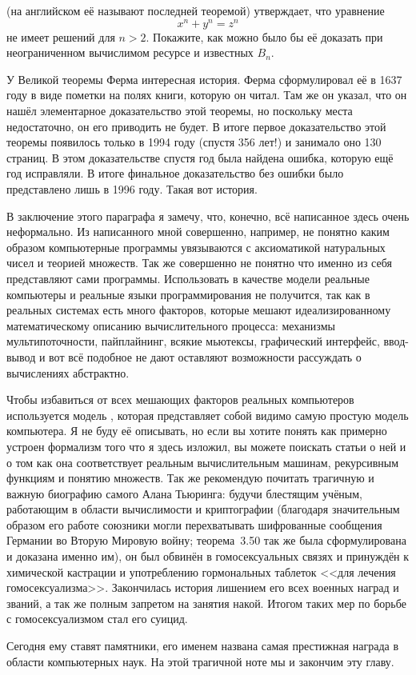 \begin{exercise}
 (на английском её называют последней теоремой) утверждает, что уравнение
$$x^n + y^n = z^n$$
не имеет решений для $n>2$. Покажите, как можно было бы её доказать при неограниченном вычислимом ресурсе и известных $B_n$.
\end{exercise}

У Великой теоремы Ферма интересная история. Ферма сформулировал её в 1637 году в виде пометки на полях книги, которую он читал. Там же он указал, что он нашёл элементарное доказательство этой теоремы, но поскольку места недостаточно, он его приводить не будет. В итоге первое доказательство этой теоремы появилось только в 1994 году (спустя 356 лет!) и занимало оно 130 страниц. В этом доказательстве спустя год была найдена ошибка, которую ещё год исправляли. В итоге финальное доказательство без ошибки было представлено лишь в 1996 году. Такая вот история.

В заключение этого параграфа я замечу, что, конечно, всё написанное здесь очень неформально. Из написанного мной совершенно, например, не понятно каким образом компьютерные программы увязываются с аксиоматикой натуральных чисел и теорией множеств. Так же совершенно не понятно что именно из себя представляют сами программы. Использовать в качестве модели реальные компьютеры и реальные языки программирования не получится, так как в реальных системах есть много факторов, которые мешают идеализированному математическому описанию вычислительного процесса: механизмы мультипоточности, пайплайнинг, всякие мьютексы, графический интерфейс, ввод-вывод и вот всё подобное не дают оставляют возможности рассуждать о вычислениях абстрактно.

Чтобы избавиться от всех мешающих факторов реальных компьютеров используется модель , которая представляет собой видимо самую простую модель компьютера. Я не буду её описывать, но если вы хотите понять как примерно устроен формализм того что я здесь изложил, вы можете поискать статьи о ней и о том как она соответствует реальным вычислительным машинам, рекурсивным функциям и понятию множеств. Так же рекомендую почитать трагичную и важную биографию самого Алана Тьюринга: будучи блестящим учёным, работающим в области вычислимости и криптографии (благодаря значительным образом его работе союзники могли перехватывать шифрованные сообщения Германии во Вторую Мировую войну; теорема~3.50 так же была сформулирована и доказана именно им), он был обвинён в гомосексуальных связях и принуждён к химической кастрации и употреблению гормональных таблеток <<для лечения гомосексуализма>>. Закончилась история лишением его всех военных наград и званий, а так же полным запретом на занятия накой. Итогом таких мер по борьбе с гомосексуализмом стал его суицид.

Сегодня ему ставят памятники, его именем названа самая престижная награда в области компьютерных наук. На этой трагичной ноте мы и закончим эту главу.
